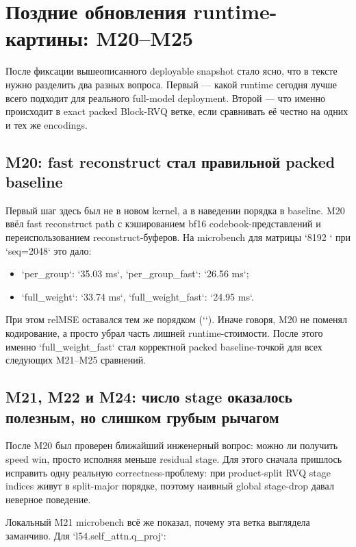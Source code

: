 \section{Поздние обновления runtime-картины: M20--M25}

После фиксации вышеописанного deployable snapshot стало ясно, что в тексте нужно
разделить два разных вопроса. Первый --- какой runtime сегодня лучше всего
подходит для реального full-model deployment. Второй --- что именно происходит в
exact packed Block-RVQ ветке, если сравнивать её честно на одних и тех же
encodings.

\subsection{M20: fast reconstruct стал правильной packed baseline}

Первый шаг здесь был не в новом kernel, а в наведении порядка в baseline.
M20 ввёл fast reconstruct path с кэшированием bf16 codebook-представлений и
переиспользованием reconstruct-буферов. На microbench для матрицы
`8192 ` при `seq=2048` это дало:

\begin{itemize}[leftmargin=1.5em]
\item `per_group`: `35.03 ms`, `per_group_fast`: `26.56 ms`;
\item `full_weight`: `33.74 ms`, `full_weight_fast`: `24.95 ms`.
\end{itemize}

При этом relMSE оставался тем же порядком (``). Иначе говоря,
M20 не поменял кодирование, а просто убрал часть лишней runtime-стоимости.
После этого именно `full_weight_fast` стал корректной packed baseline-точкой для
всех следующих M21--M25 сравнений.

\subsection{M21, M22 и M24: число stage оказалось полезным, но слишком грубым рычагом}

После M20 был проверен ближайший инженерный вопрос: можно ли получить speed win,
просто исполняя меньше residual stage. Для этого сначала пришлось исправить
одну реальную correctness-проблему: при product-split RVQ stage indices живут в
split-major порядке, поэтому наивный global stage-drop давал неверное поведение.

Локальный M21 microbench всё же показал, почему эта ветка выглядела заманчиво.
Для `l54.self_attn.q_proj`:

